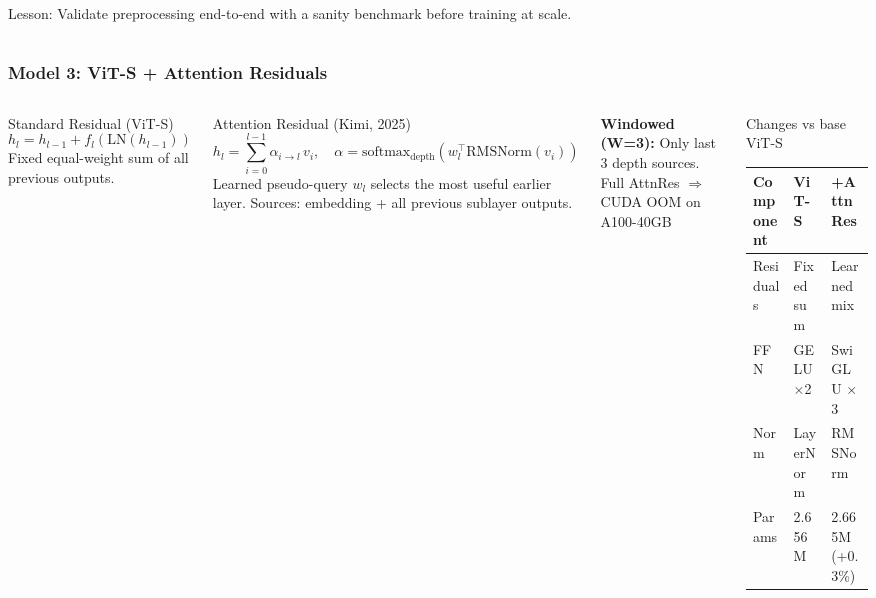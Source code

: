 \documentclass{beamer}
\begin{document}
\begin{frame}[fragile]
\begin{columns}
\vspace{0.2em}
\alert{Lesson: Validate preprocessing end-to-end with a sanity benchmark before training at scale.}

\end{columns}

\end{frame}

\begin{frame}
\frametitle{Model 3: ViT-S + Attention Residuals}

\begin{columns}

\begin{block}{Standard Residual (ViT-S)}
\small
$$h_l = h_{l-1} + f_l(\mathrm{LN}(h_{l-1}))$$
\vspace{-0.4em}
{\footnotesize Fixed equal-weight sum of all previous outputs.}
\end{block}

\vspace{0.4em}
\begin{block}{Attention Residual (Kimi, 2025)}
\small
$$h_l = \sum_{i=0}^{l-1} \alpha_{i \to l}\, v_i, \quad \alpha = \mathrm{softmax}_{\mathrm{depth}}(w_l^\top \mathrm{RMSNorm}(v_i))$$
\vspace{-0.4em}
{\footnotesize Learned pseudo-query $w_l$ selects the most useful earlier layer. Sources: embedding + all previous sublayer outputs.}
\end{block}

\vspace{0.4em}
\textbf{Windowed (W=3):} Only last 3 depth sources.\\
{\footnotesize Full AttnRes $\Rightarrow$ CUDA OOM on A100-40GB}


\begin{block}{Changes vs base ViT-S}
\footnotesize
\begin{tabular}{lll}
\toprule
\textbf{Component} & \textbf{ViT-S} & \textbf{+AttnRes} \\
\midrule
Residuals  & Fixed sum    & \alert{Learned mix} \\
FFN        & GELU $\times$2 & \alert{SwiGLU $\times$3} \\
Norm       & LayerNorm    & \alert{RMSNorm} \\
Params     & 2.656M       & 2.665M (+0.3\%) \\
\bottomrule
\end{tabular}
\end{block}


\end{columns}
\end{frame}
\end{document}
